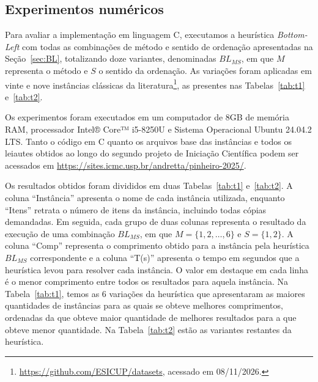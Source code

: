 \documentclass{article}
\begin{document}
\subsection{Experimentos numéricos} \label{sec:experimentosbl}


Para avaliar a implementação em linguagem C, executamos a heurística {\it Bottom-Left} com todas as combinações de método e sentido de ordenação apresentadas na Seção~\ref{sec:BL}, totalizando doze variantes, denominadas $BL_{MS}$, em que $M$ representa o método e $S$ o sentido da ordenação. As variações foram aplicadas em vinte e nove instâncias clássicas da literatura\footnote{\url{https://github.com/ESICUP/datasets}, acessado em 08/11/2026.}, as presentes nas Tabelas~\ref{tab:t1} e~\ref{tab:t2}.

Os experimentos foram executados em um computador de 8GB de memória RAM, processador Intel® Core™ i5-8250U e Sistema Operacional Ubuntu 24.04.2 LTS. Tanto o código em C quanto os arquivos base das instâncias e todos os leiautes obtidos ao longo do segundo projeto de Iniciação Científica podem ser acessados em \url{https://sites.icmc.usp.br/andretta/pinheiro-2025/}.


Os resultados obtidos foram divididos em duas Tabelas~\ref{tab:t1} e~\ref{tab:t2}. A coluna ``Instância'' apresenta o nome de cada instância utilizada, enquanto ``Itens'' retrata o número de itens da instância, incluindo todas cópias demandadas. Em seguida, cada grupo de duas colunas representa o resultado da execução de uma combinação $BL_{MS}$, em que $M = \{1, 2, \dots, 6\}$ e $S = \{1, 2\}$. A coluna ``Comp'' representa o comprimento obtido para a instância pela heurística $BL_{MS}$ correspondente e a coluna ``T(s)'' apresenta o tempo em segundos que a heurística levou para resolver cada instância. O valor em destaque em cada linha é o menor comprimento entre todos os resultados para aquela instância. Na Tabela~\ref{tab:t1}, temos as 6 variações da heurística que apresentaram as maiores quantidades de instâncias para as quais se obteve melhores comprimentos, ordenadas da que obteve maior quantidade de melhores resultados para a que obteve menor quantidade. Na Tabela~\ref{tab:t2} estão as variantes restantes da heurística.
\end{document}

